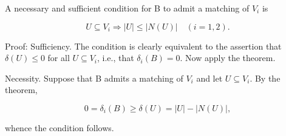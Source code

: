 A necessary and sufficient condition for B to admit a matching of $V_i$ is

$$U \subseteq V_i \Rightarrow |U| \leq |N(U)| \quad (i = 1, 2).$$

Proof: Sufficiency. The condition is clearly equivalent to the assertion that $\delta(U) \leq 0$ for all $U \subseteq V_i$, i.e., that $\delta_i(B) = 0$. Now apply the theorem.

Necessity. Suppose that B admits a matching of $V_i$ and let $U \subseteq V_i$. By the theorem,

$$0 = \delta_i(B) \geq \delta(U) = |U| - |N(U)|,$$

whence the condition follows.
